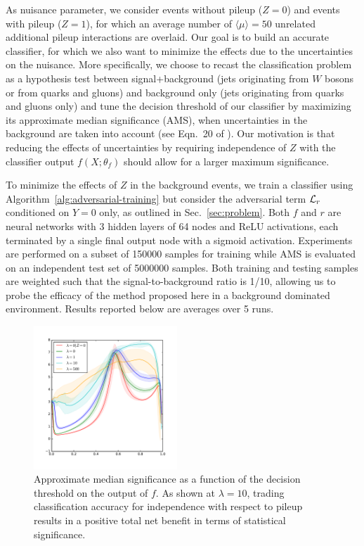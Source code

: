 \documentclass[twocolumn,superscriptaddress,aps]{revtex4-1}
\theoremstyle{plain}
\begin{document}
As nuisance parameter, we consider events without pileup ($Z=0$) and
events with pileup ($Z=1$), for which an average number of $\langle \mu \rangle =
50$ unrelated additional pileup interactions are overlaid. Our goal is to build an accurate
classifier, for which we also want to minimize the effects due to the
uncertainties on the nuisance. More specifically, we choose to recast the
classification problem as a hypothesis test between signal+background (jets
originating from $W$ bosons or from quarks and gluons) and background
only (jets originating from quarks and gluons only) and tune the decision
threshold of our classifier by maximizing its approximate median significance
(AMS), when uncertainties in the background are taken into account (see Eqn.~20
of \citep{adam2014higgs}). Our motivation is that reducing the effects of
uncertainties by requiring independence of $Z$ with the classifier output $f(X;\theta_f)$ should
allow for a larger maximum significance.

To minimize the effects of $Z$ in the background events, we train a classifier
using  Algorithm~\ref{alg:adversarial-training} but consider the adversarial
term ${\cal L}_r$ conditioned on $Y=0$ only, as outlined in
Sec.~\ref{sec:problem}. Both $f$ and $r$ are neural networks with 3 hidden
layers of 64 nodes and ReLU activations, each terminated by a single final
output node with a sigmoid activation. Experiments are performed on a subset of
150000 samples for training while AMS is evaluated on an independent test set of
5000000 samples. Both training and testing samples are weighted such that the
signal-to-background ratio is 1/10, allowing us to probe the efficacy of the
method proposed here in a background dominated environment. Results reported
below are averages over 5 runs.

\begin{figure}
    \includegraphics[width=0.48\textwidth]{figures/ams.pdf}
    \vspace{-1cm}
    \caption{Approximate median significance as a function of the decision threshold
             on the output of $f$.  As shown at $\lambda=10$, trading
             classification accuracy for independence with respect to pileup
             results in a positive total net benefit in terms of statistical significance.}
    \label{fig:physics-ams}
\end{figure}
\end{document}
